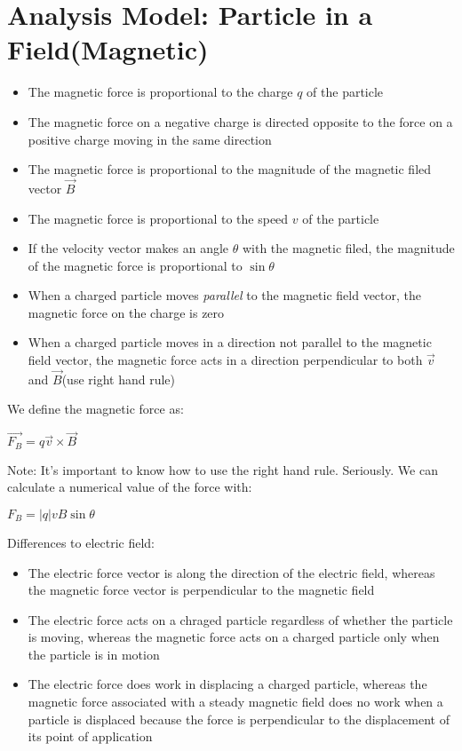 \documentclass{report}
\begin{document}
	\section{Analysis Model: Particle in a Field(Magnetic)}
		\begin{itemize}
			\item The magnetic force is proportional to the charge $q$ of the particle
			\item The magnetic force on a negative charge is directed opposite to the force on a positive charge moving in the same direction
			\item The magnetic force is proportional to the magnitude of the magnetic filed vector \textbf{$\vec{B}$}
			\item The magnetic force is proportional to the speed $v$ of the particle
			\item If the velocity vector makes an angle $\theta$ with the magnetic filed, the magnitude of the magnetic force is proportional to $\sin \theta$
			\item When a charged particle moves \textit{parallel} to the magnetic field vector, the magnetic force on the charge is zero
			\item When a charged particle moves in a direction not parallel to the magnetic field vector, the magnetic force acts in a direction perpendicular to both \textbf{$\vec{v}$} and \textbf{$\vec{B}$}(use right hand rule)
		\end{itemize}
		We define the magnetic force as:\\
		\centerline{$\vec{F_B} = q\vec{v} \times \vec{B}$}
		Note: It's important to know how to use the right hand rule. Seriously. We can calculate a numerical value of the force with:\\
		\centerline{$F_B = |q| vB \sin \theta$}
		Differences to electric field:
		\begin{itemize}
			\item The electric force vector is along the direction of the electric field, whereas the magnetic force vector is perpendicular to the magnetic field
			\item The electric force acts on a chraged particle regardless of whether the particle is moving, whereas the magnetic force acts on a charged particle only when the particle is in motion
			\item The electric force does work in displacing a charged particle, whereas the magnetic force associated with a steady magnetic field does no work when a particle is displaced because the force is perpendicular to the displacement of its point of application
		\end{itemize}
\end{document}
